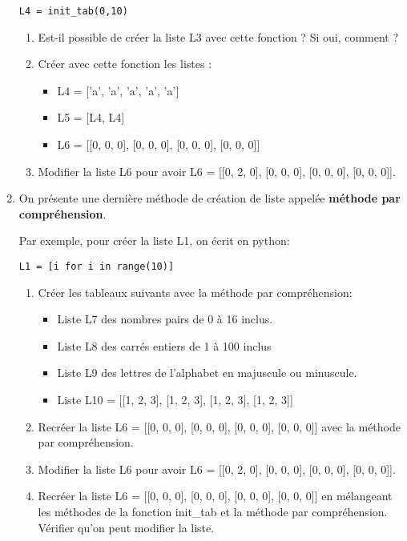 \documentclass[11pt,a4paper]{article}
\begin{document}
\begin{enumerate}
\begin{lstlisting}
L4 = init_tab(0,10)
\end{lstlisting}
\begin{enumerate}
\item Est-il possible de créer la liste \textsf{L3} avec cette fonction ? Si oui, comment ?
\item Créer avec cette fonction les listes :
\begin{itemize}[label=\textbullet]
\item \textsf{L4 = ['a', 'a', 'a', 'a', 'a']}
\item \textsf{L5 = [L4, L4]}
\item \textsf{L6 = [[0, 0, 0], [0, 0, 0], [0, 0, 0], [0, 0, 0]]}
\end{itemize}
\item Modifier la liste \textsf{L6} pour avoir \textsf{L6 = [[0, 2, 0], [0, 0, 0], [0, 0, 0], [0, 0, 0]]}.
\end{enumerate}
\item On présente une dernière méthode de création de liste appelée \textbf{méthode par compréhension}. 

Par exemple, pour créer la liste \textsc{L1}, on écrit en python:

\begin{lstlisting}
L1 = [i for i in range(10)]
\end{lstlisting}


\begin{enumerate}
\item Créer les tableaux suivants avec la méthode par compréhension:
\begin{itemize}[label=\textbullet]
\item Liste \textsc{L7} des nombres pairs de 0 à 16 inclus.
\item Liste \textsc{L8} des carrés entiers de 1 à 100 inclus
\item Liste \textsc{L9} des lettres de l'alphabet en majuscule ou minuscule.
\item Liste \textsc{L10 = [[1, 2, 3], [1, 2, 3], [1, 2, 3], [1, 2, 3]]}
\end{itemize}

\item Recréer la liste \textsf{L6 = [[0, 0, 0], [0, 0, 0], [0, 0, 0], [0, 0, 0]]} avec la méthode par compréhension.

\item Modifier la liste \textsf{L6} pour avoir \textsf{L6 = [[0, 2, 0], [0, 0, 0], [0, 0, 0], [0, 0, 0]]}.

\item Recréer la liste \textsf{L6 = [[0, 0, 0], [0, 0, 0], [0, 0, 0], [0, 0, 0]]} en mélangeant les méthodes de la fonction \textsf{init\_tab} et la méthode par compréhension. Vérifier qu'on peut modifier la liste.
\end{enumerate}


\end{enumerate}
\end{document}
